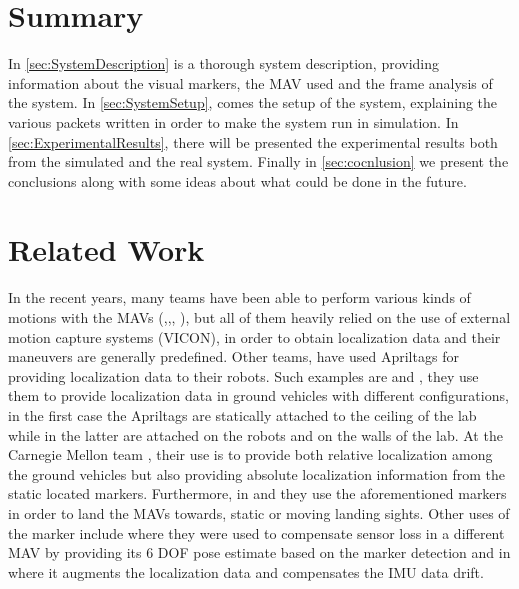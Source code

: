 \section{Summary}
\label{sec:summary}

In \autoref{sec:SystemDescription} is a thorough system description, providing information about the visual markers, the MAV used and the frame analysis of the system. In \autoref{sec:SystemSetup}, comes the setup of the system, explaining the various packets written in order to make the system run in simulation. In \autoref{sec:ExperimentalResults}, there will be presented the experimental results both from the simulated and the real system. Finally in \autoref{sec:cocnlusion} we present the conclusions along with some ideas about what could be done in the future. 
 
 
\section{Related Work}
\label{sec:related_work}

In the recent years, many teams have been able to perform various kinds of motions with the MAVs (\cite{5509452},\cite{hehIFAC11},\cite{trajectoryGenerationAndControl}, \cite{dandreaTedTalk}), but all of them heavily relied on the use of external motion capture systems (VICON\protect\footnotemark), in order to obtain localization data and their maneuvers are generally predefined. Other teams, have used Apriltags\cite{olson2011tags} for providing localization data to their robots. Such examples are \cite{lafaroLab} and \cite{robornSwam}, they use them to provide localization data in ground vehicles with different configurations, in the first case the Apriltags are statically attached to the ceiling of the lab while in the latter are attached on the robots and on the walls of the lab. At the Carnegie Mellon team \cite{robornSwam}, their use is to provide both relative localization among the ground vehicles but also providing absolute localization information from the static located markers. Furthermore, in \cite{lingkevin2014} and \cite{schaves-2015a} they use the aforementioned markers in order to land the MAVs towards, static or moving landing sights. Other uses of the marker include  \cite{hoogervorst2015bsc} where they were used to compensate sensor loss in a different MAV by providing its 6 DOF pose estimate based on the marker detection and in \cite{6842304} where it augments the localization data and compensates the IMU data drift. \\

